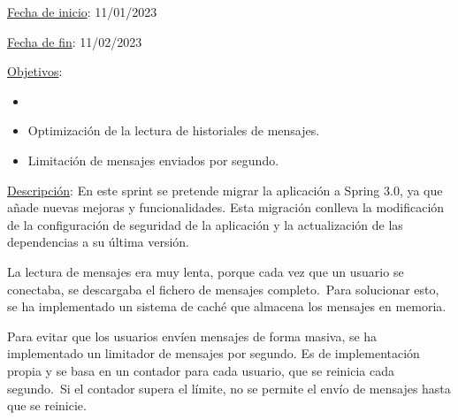 
\underline{Fecha de inicio}: 11/01/2023

\underline{Fecha de fin}: 11/02/2023

\underline{Objetivos}:
\begin{itemize}
	\item {}
	\item Optimización de la lectura de historiales de mensajes.
	\item Limitación de mensajes enviados por segundo.
\end{itemize}

\underline{Descripción}:
En este sprint se pretende migrar la aplicación a Spring 3.0, ya que añade nuevas mejoras y funcionalidades.
Esta migración conlleva la modificación de la configuración de seguridad de la aplicación y la actualización de las
dependencias a su última versión.

La lectura de mensajes era muy lenta, porque cada vez que un usuario se conectaba,
se descargaba el fichero de mensajes completo.\ Para solucionar esto, se ha implementado un sistema de caché que
almacena los mensajes en memoria.

Para evitar que los usuarios envíen mensajes de forma masiva, se ha implementado un limitador de mensajes por segundo.
Es de implementación propia y se basa en un contador para cada usuario, que se reinicia cada segundo.\ Si el contador
supera el límite, no se permite el envío de mensajes hasta que se reinicie.
